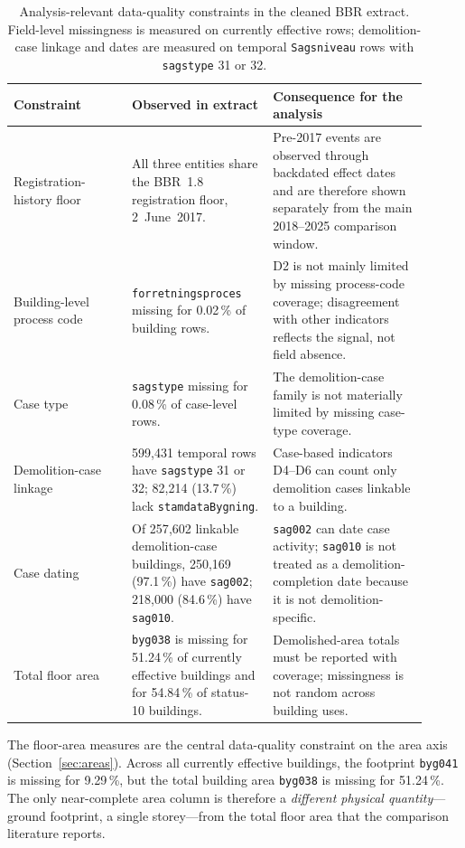\begin{table}[htbp]
\centering
\small
\caption{Analysis-relevant data-quality constraints in the cleaned BBR
extract. Field-level missingness is measured on currently effective rows;
demolition-case linkage and dates are measured on temporal
\texttt{Sagsniveau} rows with \texttt{sagstype} 31 or 32.}
\label{tab:data-quality-constraints}
\begin{tabular}{@{}p{0.26\linewidth}p{0.31\linewidth}p{0.34\linewidth}@{}}
\toprule
Constraint & Observed in extract & Consequence for the analysis \\
\midrule
Registration-history floor &
All three entities share the BBR~1.8 registration floor,
2~June~2017. &
Pre-2017 events are observed through backdated effect dates and are
therefore shown separately from the main 2018--2025 comparison window. \\
\addlinespace
Building-level process code &
\texttt{forretningsproces} missing for 0.02\,\% of building rows. &
D2 is not mainly limited by missing process-code coverage; disagreement
with other indicators reflects the signal, not field absence. \\
\addlinespace
Case type &
\texttt{sagstype} missing for 0.08\,\% of case-level rows. &
The demolition-case family is not materially limited by missing
case-type coverage. \\
\addlinespace
Demolition-case linkage &
599{,}431 temporal rows have \texttt{sagstype} 31 or 32; 82{,}214
(13.7\,\%) lack \texttt{stamdataBygning}. &
Case-based indicators D4--D6 can count only demolition cases linkable to
a building. \\
\addlinespace
Case dating &
Of 257{,}602 linkable demolition-case buildings, 250{,}169 (97.1\,\%)
have \texttt{sag002}; 218{,}000 (84.6\,\%) have \texttt{sag010}. &
\texttt{sag002} can date case activity; \texttt{sag010} is not treated
as a demolition-completion date because it is not demolition-specific. \\
\addlinespace
Total floor area &
\texttt{byg038} is missing for 51.24\,\% of currently effective
buildings and for 54.84\,\% of status-10 buildings. &
Demolished-area totals must be reported with coverage; missingness is
not random across building uses. \\
\bottomrule
\end{tabular}
\end{table}

The floor-area measures are the central data-quality constraint on the
area axis (Section~\ref{sec:areas}). Across all currently effective
buildings, the footprint \texttt{byg041} is missing for 9.29\,\%, but
the total building area \texttt{byg038} is missing for 51.24\,\%. The
only near-complete area column is therefore a \emph{different physical
quantity}---ground footprint, a single storey---from the total floor
area that the comparison literature reports.

